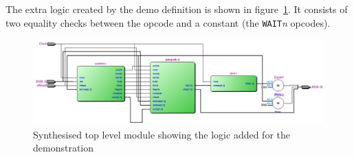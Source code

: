 The extra logic created by the demo definition is shown in figure~\ref{fig:cpudemosynth}.
It consists of two equality checks between the opcode and a constant (the \texttt{WAIT}\textit{n} opcodes).

\begin{figure}
\includegraphics[width=\textwidth]{Figures/cpudemosynth.png}
\caption{Synthesised top level module showing the logic added for the demonstration}
\label{fig:cpudemosynth}
\end{figure}


